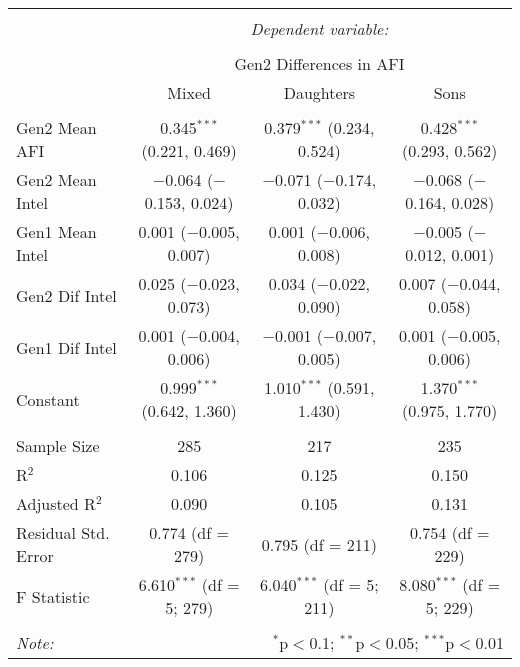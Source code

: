 
\begingroup 
\small 
\begin{tabular}{@{\extracolsep{1pt}}lccc} 
\\[-1.8ex]\hline 
\hline \\[-1.8ex] 
 & \multicolumn{3}{c}{\textit{Dependent variable:}} \\ 
\cline{2-4} 
\\[-1.8ex] & \multicolumn{3}{c}{Gen2 Differences in AFI} \\ 
 & Mixed & Daughters & Sons \\ 
\hline \\[-1.8ex] 
 Gen2 Mean AFI & 0.345$^{***}$ (0.221, 0.469) & 0.379$^{***}$ (0.234, 0.524) & 0.428$^{***}$ (0.293, 0.562) \\ 
  Gen2 Mean Intel & $-$0.064 ($-$0.153, 0.024) & $-$0.071 ($-$0.174, 0.032) & $-$0.068 ($-$0.164, 0.028) \\ 
  Gen1 Mean Intel & 0.001 ($-$0.005, 0.007) & 0.001 ($-$0.006, 0.008) & $-$0.005 ($-$0.012, 0.001) \\ 
  Gen2 Dif Intel & 0.025 ($-$0.023, 0.073) & 0.034 ($-$0.022, 0.090) & 0.007 ($-$0.044, 0.058) \\ 
  Gen1 Dif Intel & 0.001 ($-$0.004, 0.006) & $-$0.001 ($-$0.007, 0.005) & 0.001 ($-$0.005, 0.006) \\ 
  Constant & 0.999$^{***}$ (0.642, 1.360) & 1.010$^{***}$ (0.591, 1.430) & 1.370$^{***}$ (0.975, 1.770) \\ 
 \hline \\[-1.8ex] 
Sample Size & 285 & 217 & 235 \\ 
R$^{2}$ & 0.106 & 0.125 & 0.150 \\ 
Adjusted R$^{2}$ & 0.090 & 0.105 & 0.131 \\ 
Residual Std. Error & 0.774 (df = 279) & 0.795 (df = 211) & 0.754 (df = 229) \\ 
F Statistic & 6.610$^{***}$ (df = 5; 279) & 6.040$^{***}$ (df = 5; 211) & 8.080$^{***}$ (df = 5; 229) \\ 
\hline 
\hline \\[-1.8ex] 
\textit{Note:}  & \multicolumn{3}{r}{$^{*}$p$<$0.1; $^{**}$p$<$0.05; $^{***}$p$<$0.01} \\ 
\end{tabular} 
\endgroup 
